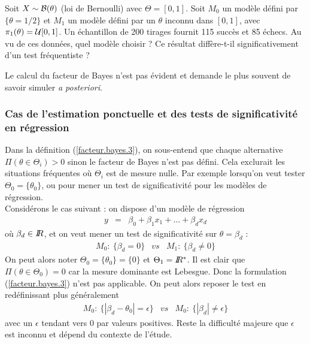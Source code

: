\begin{exec}
Soit $X\sim{\cal{B}}(\theta)$ (loi de Bernoulli) avec $\Theta=[0,1]$. Soit $M_0$ un modèle défini par $\{\theta=1/2\}$ et $M_1$ un modèle défini par un $\theta$ inconnu dans $[0,1]$, avec $\pi_1(\theta)={\cal{U}}[0,1]$. Un échantillon de 200 tirages fournit 115 succès et 85 échecs. Au vu de ces données, quel modèle choisir ? Ce résultat diffère-t-il significativement d'un test fréquentiste ?
\end{exec}


\if{} 
\fi


\begin{remark}
Le calcul du facteur de Bayes n'est pas évident et demande le plus souvent de savoir simuler {\it a posteriori}. \\
\end{remark}

\subsubsection*{Cas de l'estimation ponctuelle et des tests de significativité en régression}

Dans la définition (\ref{facteur.bayes.3}), on sous-entend que chaque alternative $\Pi(\theta\in\Theta_i)>0$ sinon le facteur de Bayes n'est pas défini. Cela exclurait les situations fréquentes où $\Theta_i$ est de mesure nulle. Par exemple lorsqu'on veut tester $\Theta_0=\{\theta_0\}$, ou pour mener un test de significativité pour les modèles de régression. \\

Considérons le cas suivant : on dispose d'un modèle de régression
\begin{eqnarray*}
y & = & \beta_0 + \beta_1 x_1 + \ldots + \beta_d x_d
\end{eqnarray*}
où $\beta_d\in I\!\!R$, 
et on veut mener un test de significativité sur $\theta=\beta_d$ :
\begin{eqnarray*}
M_0: \ \{\beta_d = 0\} & vs & M_1: \ \{\beta_d \neq 0\}
\end{eqnarray*}
On peut alors noter $\Theta_0=\{\theta_0\}=\{0\}$ et $\Theta_1=I\!\!R^*$. 
Il est clair que  $\Pi(\theta\in\Theta_0)=0$ car la mesure dominante est Lebesgue. Donc la formulation (\ref{facteur.bayes.3}) n'est pas applicable. On peut alors reposer le test en redéfinissant plus généralement
\begin{eqnarray*}
M_0: \ \{|\beta_d-\theta_0| = \epsilon\} & vs & M_0: \ \{|\beta_d| \neq \epsilon\}
\end{eqnarray*}
avec un $\epsilon$ tendant vers 0 par valeurs positives. Reste la difficulté majeure que $\epsilon$ est inconnu et dépend du contexte de l’étude. \\

